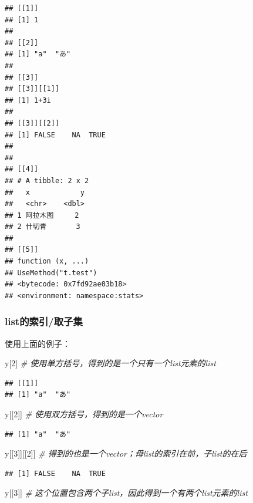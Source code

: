 \documentclass[]{book}
\newenvironment{Shaded}{\begin{snugshade}}{\end{snugshade}}
\newcommand{\CommentTok}[1]{\textcolor[rgb]{0.56,0.35,0.01}{\textit{#1}}}
\newcommand{\DecValTok}[1]{\textcolor[rgb]{0.00,0.00,0.81}{#1}}
\newcommand{\NormalTok}[1]{#1}
\begin{document}
\begin{verbatim}
## [[1]]
## [1] 1
## 
## [[2]]
## [1] "a"  "あ"
## 
## [[3]]
## [[3]][[1]]
## [1] 1+3i
## 
## [[3]][[2]]
## [1] FALSE    NA  TRUE
## 
## 
## [[4]]
## # A tibble: 2 x 2
##   x            y
##   <chr>    <dbl>
## 1 阿拉木图     2
## 2 什切青       3
## 
## [[5]]
## function (x, ...) 
## UseMethod("t.test")
## <bytecode: 0x7fd92ae03b18>
## <environment: namespace:stats>
\end{verbatim}

\hypertarget{list}{%
\subsubsection{list的索引/取子集}\label{list}}

使用上面的例子：

\begin{Shaded}
\begin{Highlighting}[]
\NormalTok{y[}\DecValTok{2}\NormalTok{] }\CommentTok{# 使用单方括号，得到的是一个只有一个list元素的list}
\end{Highlighting}
\end{Shaded}

\begin{verbatim}
## [[1]]
## [1] "a"  "あ"
\end{verbatim}

\begin{Shaded}
\begin{Highlighting}[]
\NormalTok{y[[}\DecValTok{2}\NormalTok{]] }\CommentTok{# 使用双方括号，得到的是一个vector}
\end{Highlighting}
\end{Shaded}

\begin{verbatim}
## [1] "a"  "あ"
\end{verbatim}

\begin{Shaded}
\begin{Highlighting}[]
\NormalTok{y[[}\DecValTok{3}\NormalTok{]][[}\DecValTok{2}\NormalTok{]] }\CommentTok{# 得到的也是一个vector；母list的索引在前，子list的在后}
\end{Highlighting}
\end{Shaded}

\begin{verbatim}
## [1] FALSE    NA  TRUE
\end{verbatim}

\begin{Shaded}
\begin{Highlighting}[]
\NormalTok{y[[}\DecValTok{3}\NormalTok{]] }\CommentTok{# 这个位置包含两个子list，因此得到一个有两个list元素的list}
\end{Highlighting}
\end{Shaded}
\end{document}
